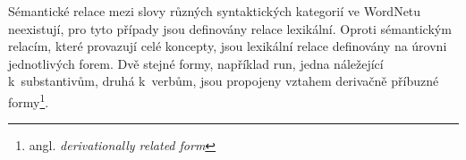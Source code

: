 \documentclass[a4paper, 11pt, oneside, showtrims]{book}
\newcommand{\itNameRef}[1]{\textit{\nameref{#1}}}
\newcommand\ex{\textsf}
\begin{document}
					Sémantické relace mezi slovy různých syntaktických kategorií ve WordNetu neexistují, pro tyto případy jsou definovány relace lexikální. Oproti sémantickým relacím, které provazují celé koncepty, jsou lexikální relace definovány na úrovni jednotlivých forem. Dvě stejné formy, například \ex{run}, jedna náležející k~substantivům, druhá k~verbům, jsou propojeny vztahem derivačně příbuzné formy\footnote{angl. \textit{derivationally related form}}. \parencite{wndocsWNgloss}



\end{document}
